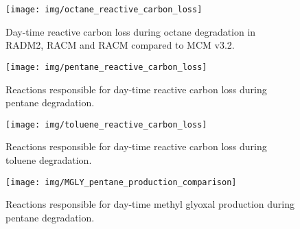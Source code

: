 
\begin{figure}[!htbp]
    \begin{center}
        \texttt{[image: img/octane\_reactive\_carbon\_loss]}
        \caption{Day-time reactive carbon loss during octane degradation in RADM2, RACM and RACM compared to MCM v3.2.}
        \label{f:octane_carbons}
    \end{center}
\end{figure} 

\begin{figure}[!htbp]
    \begin{center}
        \texttt{[image: img/pentane\_reactive\_carbon\_loss]}
        \caption{Reactions responsible for day-time reactive carbon loss during pentane degradation.}
        \label{f:pentane_carbons}
    \end{center}
\end{figure} 

\begin{figure}[!htbp]
    \begin{center}
        \texttt{[image: img/toluene\_reactive\_carbon\_loss]}
        \caption{Reactions responsible for day-time reactive carbon loss during toluene degradation.}
        \label{f:toluene_carbons}
    \end{center}
\end{figure} 

\begin{figure}[!htbp]
    \begin{center}
        \texttt{[image: img/MGLY\_pentane\_production\_comparison]}
        \caption{Reactions responsible for day-time methyl glyoxal production during pentane degradation.}
        \label{f:MGLY_pentane}
    \end{center}
\end{figure} 
